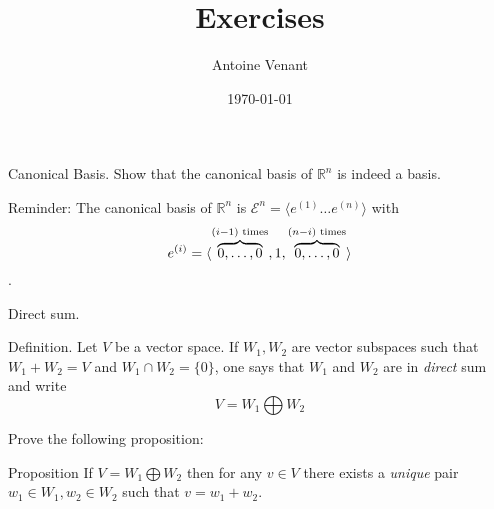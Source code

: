 \documentclass{beamer}
\begin{document}
\title{Exercises} 
\author{Antoine Venant}
\date{\today}
\maketitle

\begin{frame}{Canonical Basis.}
  Show that the canonical basis of $\mathbb{R}^n$ is indeed a basis.
  
  \begin{exampleblock}{Reminder:}
    The canonical basis of $\mathbb{R}^n$ is $\mathcal{E}^n = \langle e^{(1)} \dots e^{(n)}\rangle$ with \[e^{(i)} = \langle \overbrace{0,\dots,0}^{(i-1) \textnormal{ times}}, 1, \overbrace{0,\dots,0}^{(n-i) \textnormal{ times}} \rangle\].
  \end{exampleblock}
 
\end{frame}

\begin{frame}{Direct sum.}
  \begin{block}{Definition.}
    Let $V$ be a vector space. If $W_1, W_2$ are vector subspaces such that $W_1 + W_2 = V$ and $W_1 \cap W_2 = \{0\}$, one says that $W_1$ and $W_2$ are in \emph{direct} sum and write \[V = W_1 \bigoplus W_2\]
  \end{block}

  Prove the following proposition:
  \begin{block}{Proposition}
    If $V = W_1 \bigoplus W_2$ then for any $v \in V$ there exists a \emph{unique} pair $w_1 \in W_1, w_2 \in W_2$ such that $v = w_1 + w_2$.
  \end{block}
\end{frame}
\end{document}
